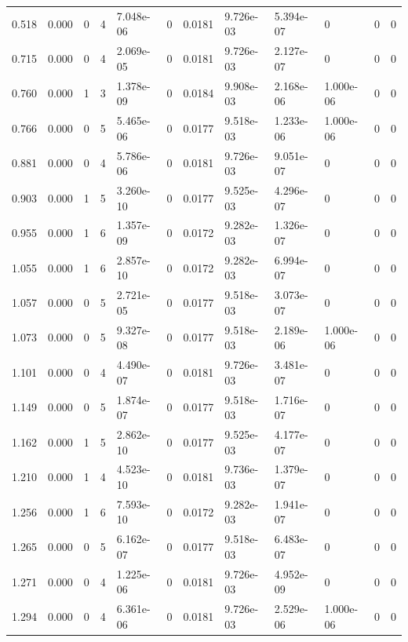 \documentclass[preview]{standalone}
\begin{document}
{{\begin{tabular}{L{1.2cm}C{1.2cm} C{0.3cm}C{0.5cm} C{1.4cm}C{1.4cm} C{1.4cm}C{1.4cm} C{1.6cm}C{1.6cm} C{1.6cm}C{1.6cm}}
  0.518  &  0.000  & 0     &  4 &  7.048e-06  & 0  &  0.0181&   9.726e-03& 5.394e-07 & 0   &  0 & 0  \\ 
  0.715  &  0.000  & 0     &  4 &  2.069e-05  & 0  &  0.0181&   9.726e-03& 2.127e-07 & 0   &  0 & 0  \\ 
  0.760  &  0.000  & 1     &  3 &  1.378e-09  & 0  &  0.0184&   9.908e-03& 2.168e-06 & 1.000e-06   &  0 & 0  \\ 
  0.766  &  0.000  & 0     &  5 &  5.465e-06  & 0  &  0.0177&   9.518e-03& 1.233e-06 & 1.000e-06   &  0 & 0  \\ 
  0.881  &  0.000  & 0     &  4 &  5.786e-06  & 0  &  0.0181&   9.726e-03& 9.051e-07 & 0   &  0 & 0  \\ 
  0.903  &  0.000  & 1     &  5 &  3.260e-10  & 0  &  0.0177&   9.525e-03& 4.296e-07 & 0   &  0 & 0  \\ 
  0.955  &  0.000  & 1     &  6 &  1.357e-09  & 0  &  0.0172&   9.282e-03& 1.326e-07 & 0   &  0 & 0  \\ 
  1.055  &  0.000  & 1     &  6 &  2.857e-10  & 0  &  0.0172&   9.282e-03& 6.994e-07 & 0   &  0 & 0  \\ 
  1.057  &  0.000  & 0     &  5 &  2.721e-05  & 0  &  0.0177&   9.518e-03& 3.073e-07 & 0   &  0 & 0  \\ 
  1.073  &  0.000  & 0     &  5 &  9.327e-08  & 0  &  0.0177&   9.518e-03& 2.189e-06 & 1.000e-06   &  0 & 0  \\ 
  1.101  &  0.000  & 0     &  4 &  4.490e-07  & 0  &  0.0181&   9.726e-03& 3.481e-07 & 0   &  0 & 0  \\ 
  1.149  &  0.000  & 0     &  5 &  1.874e-07  & 0  &  0.0177&   9.518e-03& 1.716e-07 & 0   &  0 & 0  \\ 
  1.162  &  0.000  & 1     &  5 &  2.862e-10  & 0  &  0.0177&   9.525e-03& 4.177e-07 & 0   &  0 & 0  \\ 
  1.210  &  0.000  & 1     &  4 &  4.523e-10  & 0  &  0.0181&   9.736e-03& 1.379e-07 & 0   &  0 & 0  \\ 
  1.256  &  0.000  & 1     &  6 &  7.593e-10  & 0  &  0.0172&   9.282e-03& 1.941e-07 & 0   &  0 & 0  \\ 
  1.265  &  0.000  & 0     &  5 &  6.162e-07  & 0  &  0.0177&   9.518e-03& 6.483e-07 & 0   &  0 & 0  \\ 
  1.271  &  0.000  & 0     &  4 &  1.225e-06  & 0  &  0.0181&   9.726e-03& 4.952e-09 & 0   &  0 & 0  \\ 
  1.294  &  0.000  & 0     &  4 &  6.361e-06  & 0  &  0.0181&   9.726e-03& 2.529e-06 & 1.000e-06   &  0 & 0  \\ 

\end{tabular}}}
\end{document}
